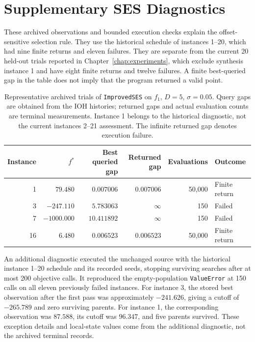 \section{Supplementary SES Diagnostics}
\label{app:ses_diagnostics}

These archived observations and bounded execution checks explain the
offset-sensitive selection rule. They use the historical schedule of
instances 1--20, which had nine finite returns and eleven failures.
They are separate from the current 20 held-out trials reported in
Chapter~\ref{chap:experiments}, which exclude synthesis instance 1 and
have eight finite returns and twelve failures. A finite best-queried
gap in the table does not imply that the program returned a valid point.

\begin{table}[htbp]
    \centering
    \caption{Representative archived trials of \texttt{ImprovedSES} on
    $f_1$, $D=5$, $\sigma=0.05$. Query gaps are obtained from the IOH
    histories; returned gaps and actual evaluation counts are terminal
    measurements. Instance 1 belongs to the historical diagnostic, not
    the current instances 2--21 assessment. The infinite returned gap
    denotes execution failure.}
    \label{tab:ses_instance_diagnostics}
    \small
    \setlength{\tabcolsep}{4pt}
    \begin{tabular}{rrrrrl}
        \hline
        Instance & $f^*$ & Best queried gap & Returned gap & Evaluations & Outcome \\
        \hline
        1 & $79.480$ & $0.007006$ & $0.007006$ & 50,000 & Finite return \\
        3 & $-247.110$ & $5.783063$ & $\infty$ & 150 & Failed \\
        7 & $-1000.000$ & $10.411892$ & $\infty$ & 150 & Failed \\
        16 & $6.480$ & $0.006523$ & $0.006523$ & 50,000 & Finite return \\
        \hline
    \end{tabular}
\end{table}

\FloatBarrier

An additional diagnostic executed the unchanged source with the historical
instance 1--20 schedule and its recorded seeds, stopping surviving searches
after at most 200 objective calls. It reproduced the empty-population \texttt{ValueError}
at 150 calls on all eleven previously failed instances. For instance 3,
the stored best observation after the first pass was approximately
$-241.626$, giving a cutoff of $-265.789$ and zero surviving parents.
For instance 1, the corresponding observation was $87.588$, its cutoff
was $96.347$, and five parents survived. These exception details and local-state values come from the additional
diagnostic, not the archived terminal records.

